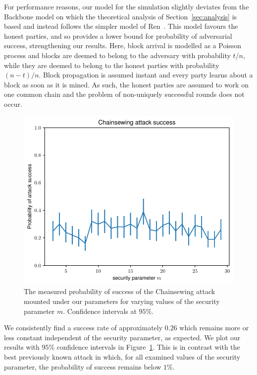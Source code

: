 For performance reasons, our model for the simulation slightly deviates from the Backbone model on which the theoretical analysis of Section~\ref{sec:analysis} is based and instead follows the simpler model of Ren~\cite{nakamoto-simple}. This model favours the honest parties, and so provides a lower bound for probability of adversarial success, strengthening our results. Here, block arrival is modelled as a Poisson process and blocks are deemed to belong to the adversary with probability $t / n$, while they are deemed to belong to the honest parties with probability $(n - t) / n$. Block propagation is assumed instant and every party learns about a block as soon as it is mined. As such, the honest parties are assumed to work on one common chain and the problem of non-uniquely successful rounds does not occur.

\begin{figure}[h!]
	\begin{center}
		\includegraphics[width=0.8 \columnwidth]{figures/attack-confidence.pdf}
	\end{center}
	\caption{The measured probability of success of the Chainsewing attack mounted under our parameters for varying values of the security parameter $m$. Confidence intervals at $95\%$.}
	\label{fig:confidence}
\end{figure}

We consistently find a success rate of approximately $0.26$ which remains more or less constant independent of the security parameter, as expected. We plot our results with $95\%$ confidence intervals in Figure~\ref{fig:confidence}. This is in contrast with the best previously known attack in which, for all examined values of the security parameter, the probability of success remains below $1\%$.
